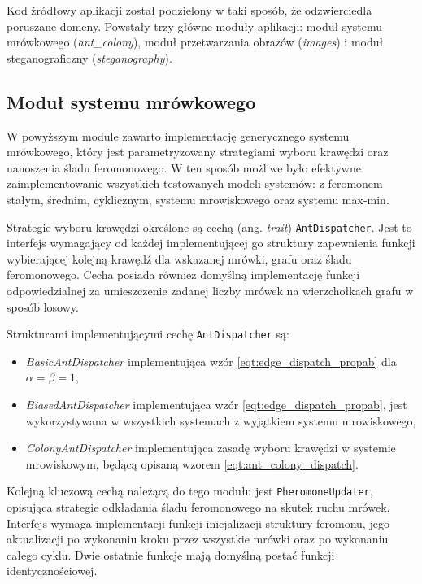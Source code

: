 {{        Kod źródłowy aplikacji został podzielony w taki sposób, że odzwierciedla poruszane domeny. Powstały trzy główne
        moduły aplikacji: moduł systemu mrówkowego (\textit{ant\_colony}), moduł przetwarzania obrazów (\textit{images})
        i moduł steganograficzny (\textit{steganography}).


        \subsection{Moduł systemu mrówkowego}\label{sec:code_ant_colony}
        {
            W powyższym module zawarto implementację generycznego systemu mrówkowego, który jest parametryzowany
            strategiami wyboru krawędzi oraz nanoszenia śladu feromonowego. W ten sposób możliwe było efektywne
            zaimplementowanie wszystkich testowanych modeli systemów: z feromonem stałym, średnim, cyklicznym, systemu
            mrowiskowego oraz systemu max-min.

            Strategie wyboru krawędzi określone są cechą (ang. \textit{trait}) \texttt{AntDispatcher}. Jest to interfejs
            wymagający od każdej implementującej go struktury zapewnienia funkcji wybierającej kolejną krawędź dla
            wskazanej mrówki, grafu oraz śladu feromonowego. Cecha posiada również domyślną implementację funkcji
            odpowiedzialnej za umieszczenie zadanej liczby mrówek na wierzchołkach grafu w sposób losowy.

            Strukturami implementującymi cechę \texttt{AntDispatcher} są:

            \begin{itemize}
                \item \textit{BasicAntDispatcher} implementująca wzór \ref{eqt:edge_dispatch_propab} dla $\alpha = \beta
                = 1$,
                \item \textit{BiasedAntDispatcher} implementująca wzór \ref{eqt:edge_dispatch_propab}, jest
                wykorzystywana w wszystkich systemach z wyjątkiem systemu mrowiskowego,
                \item \textit{ColonyAntDispatcher} implementująca zasadę wyboru krawędzi w systemie mrowiskowym, będącą opisaną wzorem \ref{eqt:ant_colony_dispatch}.
            \end{itemize}

            Kolejną kluczową cechą należącą do tego modułu jest \texttt{PheromoneUpdater}, opisująca strategie
            odkładania śladu feromonowego na skutek ruchu mrówek. Interfejs wymaga implementacji funkcji inicjalizacji
            struktury feromonu, jego aktualizacji po wykonaniu kroku przez wszystkie mrówki oraz po wykonaniu całego
            cyklu. Dwie ostatnie funkcje mają domyślną postać funkcji identycznościowej.

}}}
